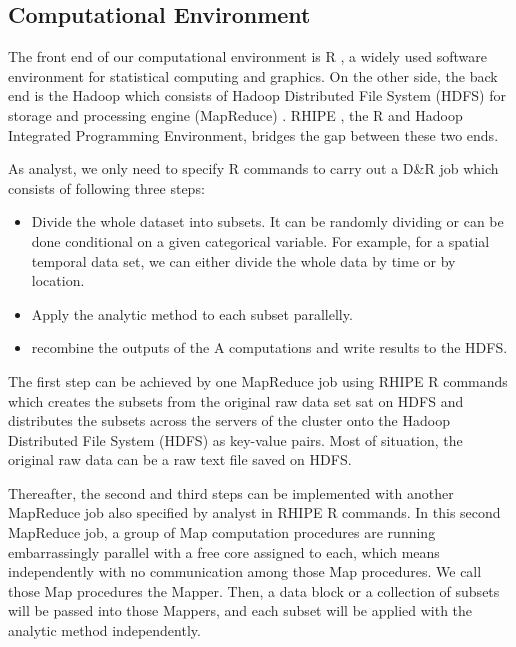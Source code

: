 \subsection{Computational Environment}

The front end of our computational environment is R \cite{R}, a widely used 
software environment for statistical computing and graphics. On the other side, the
back end is the Hadoop which consists of Hadoop Distributed File 
System (HDFS) \cite{HDFS} for storage and processing engine (MapReduce) 
\cite{mapreduce}. RHIPE \cite{Guha:2010}, the R and Hadoop Integrated Programming 
Environment, bridges the gap between these two ends. 

As analyst, we only need to specify R commands to carry out a D\&R job which
consists of following three steps:
\begin{itemize}
\item Divide the whole dataset into subsets. It can be randomly dividing or
can be done conditional on a given categorical variable. For example, for a spatial
temporal data set, we can either divide the whole data by time or by location. 
\item Apply the analytic method to each subset parallelly.   
\item recombine the outputs of the A computations and write results to the HDFS. 
\end{itemize}  

The first step can be achieved by one MapReduce job using RHIPE R commands which 
creates the subsets from the original raw data set sat on HDFS and 
distributes the subsets across the servers of the cluster onto the Hadoop 
Distributed File System (HDFS) as key-value pairs. Most of situation, the original
raw data can be a raw text file saved on HDFS.

Thereafter, the second and
third steps can be implemented with another MapReduce job also specified by
analyst in RHIPE R commands. In this second MapReduce job, a group of Map
computation procedures are running embarrassingly parallel with a free core 
assigned to each, which means independently with no communication among those Map
procedures. We call those Map procedures the Mapper. Then, a data block or a 
collection of subsets will be passed into those Mappers, and each subset
will be applied with the analytic method independently.


